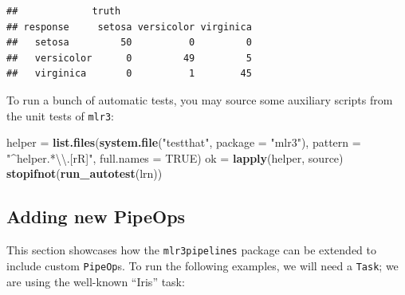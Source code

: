 \documentclass[]{article}
\newenvironment{Shaded}{\begin{snugshade}}{\end{snugshade}}
\newcommand{\CharTok}[1]{\textcolor[rgb]{0.31,0.60,0.02}{#1}}
\newcommand{\DataTypeTok}[1]{\textcolor[rgb]{0.13,0.29,0.53}{#1}}
\newcommand{\KeywordTok}[1]{\textcolor[rgb]{0.13,0.29,0.53}{\textbf{#1}}}
\newcommand{\NormalTok}[1]{#1}
\newcommand{\OperatorTok}[1]{\textcolor[rgb]{0.81,0.36,0.00}{\textbf{#1}}}
\newcommand{\OtherTok}[1]{\textcolor[rgb]{0.56,0.35,0.01}{#1}}
\newcommand{\StringTok}[1]{\textcolor[rgb]{0.31,0.60,0.02}{#1}}
\renewenvironment{Shaded} {\begin{snugshade}\small} {\end{snugshade}}
\begin{document}
\begin{verbatim}
##             truth
## response     setosa versicolor virginica
##   setosa         50          0         0
##   versicolor      0         49         5
##   virginica       0          1        45
\end{verbatim}

To run a bunch of automatic tests, you may source some auxiliary scripts from the unit tests of \texttt{mlr3}:

\begin{Shaded}
\begin{Highlighting}[]
\NormalTok{helper =}\StringTok{ }\KeywordTok{list.files}\NormalTok{(}\KeywordTok{system.file}\NormalTok{(}\StringTok{"testthat"}\NormalTok{, }\DataTypeTok{package =} \StringTok{"mlr3"}\NormalTok{), }\DataTypeTok{pattern =} \StringTok{"^helper.*}\CharTok{\textbackslash{}\textbackslash{}}\StringTok{.[rR]"}\NormalTok{, }\DataTypeTok{full.names =} \OtherTok{TRUE}\NormalTok{)}
\NormalTok{ok =}\StringTok{ }\KeywordTok{lapply}\NormalTok{(helper, source)}
\KeywordTok{stopifnot}\NormalTok{(}\KeywordTok{run_autotest}\NormalTok{(lrn))}
\end{Highlighting}
\end{Shaded}

\hypertarget{extending-pipeops}{%
\subsection{Adding new PipeOps}\label{extending-pipeops}}

This section showcases how the \texttt{mlr3pipelines} package can be extended to include custom \texttt{PipeOp}s.
To run the following examples, we will need a \texttt{Task}; we are using the well-known ``Iris'' task:

\begin{Shaded}
\end{Shaded}
\end{document}
